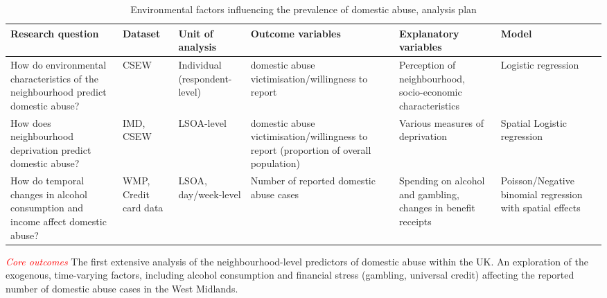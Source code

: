 \documentclass[11pt, a4paper]{article}
\begin{document}
\begin{table}[!htbp]
\caption{Environmental factors influencing the prevalence of domestic abuse, analysis plan}
  \begin{threeparttable}[t]
  \centering
       \begin{tabular}{ L{2.8cm}  C{1.8cm}  C{1.8cm}  C{3.2cm}  C{2.8cm}  C{2cm} }
    \toprule
     \textbf{Research question} & \textbf{Dataset}    & \textbf{Unit of analysis} & \textbf{Outcome variables} & \textbf{Explanatory variables} & \textbf{Model} \\
    \midrule
    How do environmental characteristics of the neighbourhood predict domestic abuse? & CSEW & Individual (respondent-level) & domestic abuse victimisation/willingness to report & Perception of neighbourhood, socio-economic characteristics & Logistic regression \\
         \midrule
          How does neighbourhood deprivation predict domestic abuse? & IMD, CSEW & LSOA-level & domestic abuse victimisation/willingness to report (proportion of overall population) & Various measures of deprivation & Spatial Logistic regression \\
         \midrule
    How do temporal changes in alcohol consumption and income affect domestic abuse? & WMP, Credit card data & LSOA, day/week-level & Number of reported domestic abuse cases & Spending on alcohol and gambling, changes in benefit receipts & Poisson/Negative binomial regression with spatial effects \\

     \bottomrule
  \end{tabular}
    \end{threeparttable}%
  \label{tab:addlabel}%
\end{table}%

\textcolor{red}{\textit{Core outcomes}} The first extensive analysis of the neighbourhood-level predictors of domestic abuse within the UK. An exploration of the exogenous, time-varying factors, including alcohol consumption and financial stress (gambling, universal credit) affecting the reported number of domestic abuse cases in the West Midlands. 



%
%
%
%
%
%
%
%
%
\end{document}
